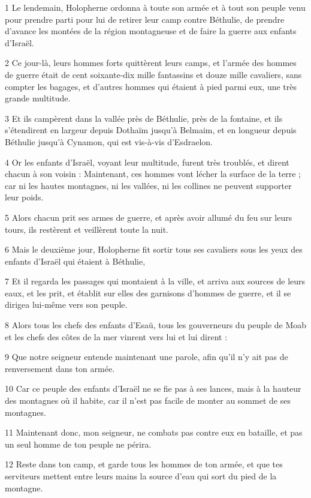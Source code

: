 \par 1 Le lendemain, Holopherne ordonna à toute son armée et à tout son peuple venu pour prendre parti pour lui de retirer leur camp contre Béthulie, de prendre d'avance les montées de la région montagneuse et de faire la guerre aux enfants d'Israël.
\par 2 Ce jour-là, leurs hommes forts quittèrent leurs camps, et l'armée des hommes de guerre était de cent soixante-dix mille fantassins et douze mille cavaliers, sans compter les bagages, et d'autres hommes qui étaient à pied parmi eux, une très grande multitude.
\par 3 Et ils campèrent dans la vallée près de Béthulie, près de la fontaine, et ils s'étendirent en largeur depuis Dothaïm jusqu'à Belmaim, et en longueur depuis Béthulie jusqu'à Cynamon, qui est vis-à-vis d'Esdraelon.
\par 4 Or les enfants d'Israël, voyant leur multitude, furent très troublés, et dirent chacun à son voisin : Maintenant, ces hommes vont lécher la surface de la terre ; car ni les hautes montagnes, ni les vallées, ni les collines ne peuvent supporter leur poids.
\par 5 Alors chacun prit ses armes de guerre, et après avoir allumé du feu sur leurs tours, ils restèrent et veillèrent toute la nuit.
\par 6 Mais le deuxième jour, Holopherne fit sortir tous ses cavaliers sous les yeux des enfants d'Israël qui étaient à Béthulie,
\par 7 Et il regarda les passages qui montaient à la ville, et arriva aux sources de leurs eaux, et les prit, et établit sur elles des garnisons d'hommes de guerre, et il se dirigea lui-même vers son peuple.
\par 8 Alors tous les chefs des enfants d'Esaü, tous les gouverneurs du peuple de Moab et les chefs des côtes de la mer vinrent vers lui et lui dirent :
\par 9 Que notre seigneur entende maintenant une parole, afin qu'il n'y ait pas de renversement dans ton armée.
\par 10 Car ce peuple des enfants d'Israël ne se fie pas à ses lances, mais à la hauteur des montagnes où il habite, car il n'est pas facile de monter au sommet de ses montagnes.
\par 11 Maintenant donc, mon seigneur, ne combats pas contre eux en bataille, et pas un seul homme de ton peuple ne périra.
\par 12 Reste dans ton camp, et garde tous les hommes de ton armée, et que tes serviteurs mettent entre leurs mains la source d'eau qui sort du pied de la montagne.
